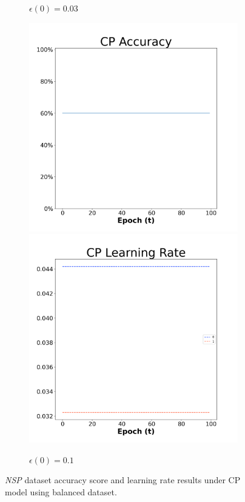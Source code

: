 \begin{figure}[H]
\begin{subfigure}{0.3\textwidth}
  \caption{$\epsilon(0)=0.03$}
\end{subfigure}\hfil %
\begin{subfigure}{0.3\textwidth}
  \includegraphics[width=\linewidth]{images/exper1/NSP/CP_0.1_acc.png}
  \includegraphics[width=\linewidth]{images/exper1/NSP/CP_0.1_lr.png}
  \caption{$\epsilon(0)=0.1$}
\end{subfigure}

\caption{\textit{NSP} dataset accuracy score and learning rate results under CP model using balanced dataset.}
\end{figure}

